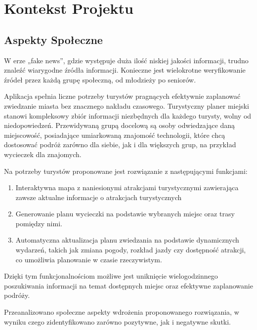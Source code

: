 
\chapter{Kontekst Projektu}
\label{ch:kontekst-projektu}

\section{Aspekty Społeczne}
\label{sec:aspekty-spoleczne}

W erze „fake news”, gdzie występuje duża ilość niskiej jakości informacji, trudno znaleźć wiarygodne źródła informacji.
Konieczne jest wielokrotne weryfikowanie źródeł przez każdą grupę społeczną, od młodzieży po seniorów.

\indent Aplikacja spełnia liczne potrzeby turystów pragnących efektywnie zaplanować zwiedzanie miasta bez znacznego nakładu czasowego.
Turystyczny planer miejski stanowi kompleksowy zbiór informacji niezbędnych dla każdego turysty, wolny od niedopowiedzeń.
Przewidywaną grupą docelową są osoby odwiedzające daną miejscowość, posiadające umiarkowaną znajomość technologii, które chcą dostosować podróż zarówno dla siebie, jak i dla większych grup, na przykład wycieczek dla znajomych.

\indent Na potrzeby turystów proponowane jest rozwiązanie z następującymi funkcjami:

\begin{enumerate}
    \item Interaktywna mapa z naniesionymi atrakcjami turystycznymi zawierająca zawsze aktualne informacje o atrakcjach turystycznych
    \item Generowanie planu wycieczki na podstawie wybranych miejsc oraz trasy pomiędzy nimi.
    \item Automatyczna aktualizacja planu zwiedzania na podstawie dynamicznych wydarzeń, takich jak zmiana pogody, rozkład jazdy czy dostępność atrakcji, co umożliwia planowanie w czasie rzeczywistym.
\end{enumerate}

Dzięki tym funkcjonalnościom możliwe jest uniknięcie wielogodzinnego poszukiwania informacji na temat dostępnych miejsc oraz efektywne zaplanowanie podróży.

\indent Przeanalizowano społeczne aspekty wdrożenia proponowanego rozwiązania, w wyniku czego zidentyfikowano zarówno pozytywne, jak i negatywne skutki.

